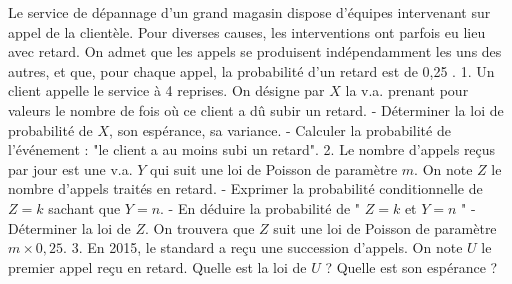 Le service de dépannage d'un grand magasin dispose d'équipes intervenant sur appel de la clientèle. Pour diverses causes, les interventions ont parfois eu lieu avec retard. On admet que les appels se produisent indépendamment les uns des autres, et que, pour chaque appel, la probabilité d'un retard est de 0,25 .
1. Un client appelle le service à 4 reprises. On désigne par \(X\) la v.a. prenant pour valeurs le nombre de fois où ce client a dû subir un retard.
- Déterminer la loi de probabilité de \(X\), son espérance, sa variance.
- Calculer la probabilité de l'événement : "le client a au moins subi un retard".
2. Le nombre d'appels reçus par jour est une v.a. \(Y\) qui suit une loi de Poisson de paramètre \(m\). On note \(Z\) le nombre d'appels traités en retard.
- Exprimer la probabilité conditionnelle de \(Z=k\) sachant que \(Y=n\).
- En déduire la probabilité de " \(Z=k\) et \(Y=n\) "
- Déterminer la loi de \(Z\). On trouvera que \(Z\) suit une loi de Poisson de paramètre \(m \times 0,25\).
3. En 2015, le standard a reçu une succession d'appels. On note \(U\) le premier appel reçu en retard. Quelle est la loi de \(U\) ? Quelle est son espérance ?